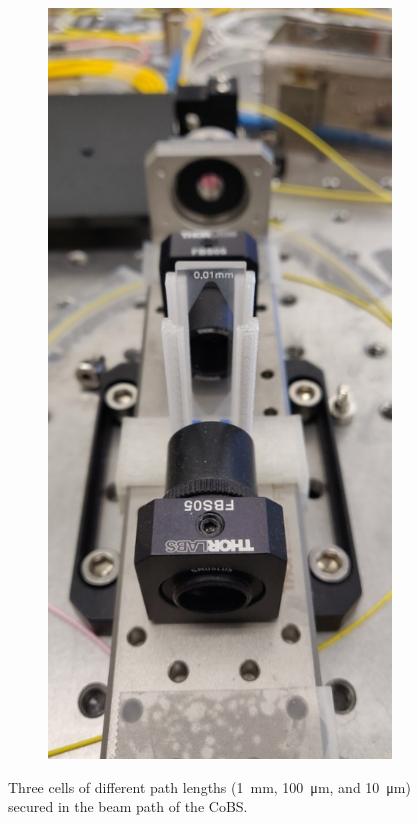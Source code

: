 \begin{figure}[t]
\begin{subfigure}[b]{0.3\textwidth}
        \caption{}
        \label{fig:Raman:100umCS2pic}
    \end{subfigure}
    \hfill
    \begin{subfigure}[b]{0.3\textwidth}
        \centering
        \includegraphics[width=\textwidth]{figs/4-Raman/10umCS2.jpg}
        \caption{}
        \label{fig:Raman:10umCS2pic}
    \end{subfigure}
    \caption{Three  cells of different path lengths (\SI{1}{\milli\meter}, \SI{100}{\micro\meter}, and \SI{10}{\micro\meter}) secured in the beam path of the \acl{CoBS}.}
    \label{fig:Raman:CS2cellpics}
\end{figure}

